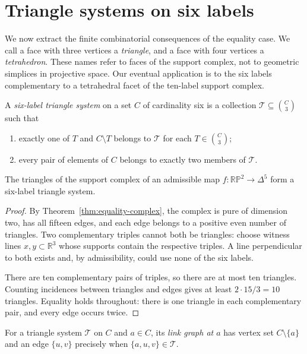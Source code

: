 \section{Triangle systems on six labels}\label{sec:six-labels}

We now extract the finite combinatorial consequences of the equality case.
We call a face with three vertices a \emph{triangle}, and a face with four
vertices a \emph{tetrahedron}. These names refer to faces of the support
complex, not to geometric simplices in projective space.
Our eventual application is to the six labels complementary to a
tetrahedral facet of the ten-label support complex.

\begin{definition}\label{def:six-system}
A \emph{six-label triangle system} on a set $C$ of cardinality six is a
collection $\mathcal T\subseteq\binom{C}{3}$ such that
\begin{enumerate}
\item exactly one of $T$ and $C\setminus T$ belongs to $\mathcal T$ for
      each $T\in\binom{C}{3}$;
\item every pair of elements of $C$ belongs to exactly two members of
      $\mathcal T$.
\end{enumerate}
\end{definition}

\begin{lemma}\label{lem:six-from-map}
The triangles of the support complex of an admissible map
$f:\mathbb{RP}^2\to\Delta^5$ form a six-label triangle system.
\end{lemma}

\begin{proof}
By Theorem~\ref{thm:equality-complex}, the complex is pure of
dimension two, has all fifteen edges, and each edge belongs to a positive
even number of triangles. Two complementary triples cannot both be
triangles: choose witness lines $x,y\subset\mathbb R^3$ whose supports
contain the respective triples. A line perpendicular to both exists and,
by admissibility, could use none of the six labels.

There are ten complementary pairs of triples, so there are at most ten
triangles. Counting incidences between triangles and edges gives at least
$2\cdot15/3=10$ triangles. Equality holds throughout: there is one triangle
in each complementary pair, and every edge occurs twice.
\end{proof}

For a triangle system $\mathcal T$ on $C$ and $a\in C$, its \emph{link
graph at $a$} has vertex set $C\setminus\{a\}$ and an edge $\{u,v\}$
precisely when $\{a,u,v\}\in\mathcal T$.

